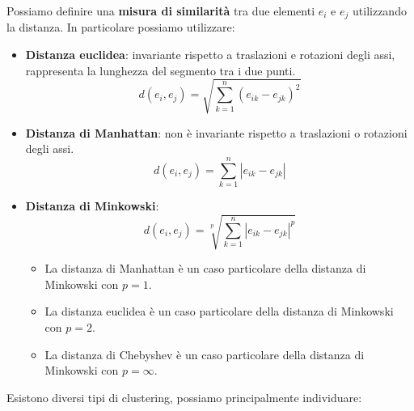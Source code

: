 \begin{definizione}
      Possiamo definire una \textbf{misura di similarità} tra due elementi $e_i$ e
      $e_j$ utilizzando la distanza. In particolare possiamo utilizzare:
      \begin{itemize}
            \item \textbf{Distanza euclidea}: invariante rispetto a traslazioni
                  e rotazioni degli assi, rappresenta la lunghezza del segmento
                  tra i due punti.
                  \begin{equation}
                        d(e_i, e_j) = \sqrt{\sum_{k=1}^n (e_{ik} - e_{jk})^2}
                  \end{equation}
            \item \textbf{Distanza di Manhattan}: non è invariante rispetto a
                  traslazioni o rotazioni degli assi.
                  \begin{equation}
                        d(e_i, e_j) = \sum_{k=1}^n |e_{ik} - e_{jk}|
                  \end{equation}
            \item \textbf{Distanza di Minkowski}:
                  \begin{equation}
                        d(e_i, e_j) = \sqrt[p]{\sum_{k=1}^n |e_{ik} - e_{jk}|^p}
                  \end{equation}
                  \begin{itemize}
                        \item La distanza di Manhattan è un caso particolare
                              della distanza di Minkowski con $p = 1$.
                        \item La distanza euclidea è un caso particolare della
                              distanza di Minkowski con $p = 2$.
                        \item La distanza di Chebyshev è un caso particolare
                              della distanza di Minkowski con $p = \infty$.
                  \end{itemize}
      \end{itemize}
\end{definizione}
Esistono diversi tipi di clustering, possiamo principalmente individuare:
